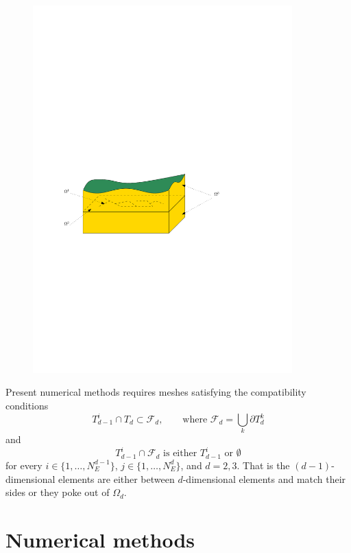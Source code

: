 \documentclass[12pt,a4paper]{report}
\begin{document}
\begin{figure}[h]
\centering
\includegraphics[width=10cm]{ground_fractures}
\label{fig:multi-dim}
\end{figure}

Present numerical methods requires meshes satisfying the compatibility conditions
\begin{equation}
        T_{d-1}^i \cap T_d \subset \mathcal{F}_d,   \qquad \text{where } \mathcal{F}_d = \bigcup_{k} \partial T_{d}^{k}
\end{equation}
and
\begin{equation}
        T_{d-1}^i \cap \mathcal{F}_d    \text{ is either $T_{d-1}^i$ or $\emptyset$}    
\end{equation}
for every $i\in\{1,\dots, N_{E}^{d-1}\}$, $j\in\{1,\dots,N_{E}^{d}\}$,  and $d=2,3$. That is the $(d-1)$-dimensional elements are either between $d$-dimensional elements and
match their sides or they poke out of $\Omega_d$. 




%
\chapter{Numerical methods}
\end{document}
